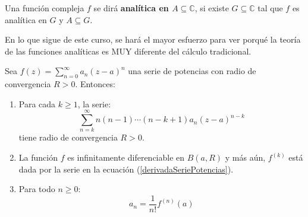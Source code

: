 \documentclass[12pt]{report}
\theoremstyle{largebreak}
\begin{document}
    \begin{mydef}
        Una función compleja $f$ se dirá \textbf{analítica en $A\subseteq\mathbb{C}$}, si existe $G\subseteq\mathbb{C}$ tal que $f$ es analítica en $G$ y $A\subseteq G$.
    \end{mydef}

    En lo que sigue de este curso, se hará el mayor esfuerzo para ver porqué la teoría de las funciones analíticas es MUY diferente del cálculo tradicional.

    \begin{propo}
        Sea $f(z)=\sum_{ n=0}^\infty a_n(z-a)^n$ una serie de potencias con radio de convergencia $R>0$. Entonces:
        \begin{enumerate}[label = \textit{(\arabic*)}]
            \item Para cada $k\geq 1$, la serie:
            \begin{equation}
                \label{derivadaSeriePotencias}
                \sum_{n=k}^\infty n(n-1)\cdots(n-k+1)a_n(z-a)^{ n-k}
            \end{equation}
            tiene radio de convergencia $R>0$.
            \item La función $f$ es infinitamente diferenciable en $B(a,R)$ y más aún, $f^{(k)}$ está dada por la serie en la ecuación (\ref{derivadaSeriePotencias}).
            \item Para todo $n\geq0$:
            \begin{equation*}
                a_n=\frac{1}{n!}f^{(n)}(a)
            \end{equation*}
        \end{enumerate}
    \end{propo}
\end{document}
